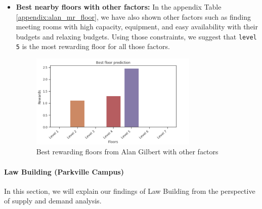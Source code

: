 \begin{itemize}



\item \textbf{Best nearby floors with other factors:} In the appendix Table \ref{appendix:alan_mr_floor}, we have also shown other factors such as finding meeting rooms with high capacity, equipment, and easy availability with their budgets and relaxing budgets. Using those constraints, we suggest that \texttt{level 5} is the most rewarding floor for all those factors.



\begin{figure}[H]
\centering
  \includegraphics[width=8cm]{content/results/floors/plots/alan-floor-no-factors.png}
  
\caption{Best rewarding floors from Alan Gilbert with other factors}
\label{fig:alan-floor-other-factors}
\end{figure}

\end{itemize}


\paragraph{Law Building (Parkville Campus)}
In this section, we will explain our findings of Law Building from the perspective of supply and demand analysis.

